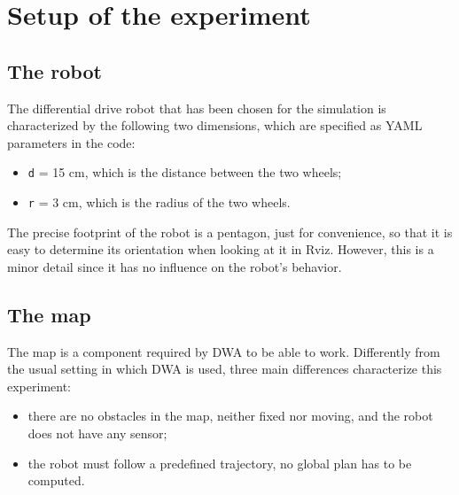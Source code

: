 \documentclass[11pt,a4paper]{article}
\begin{document}

\section{Setup of the experiment}



\subsection{The robot}

The differential drive robot that has been chosen for the simulation is characterized by the following
two dimensions, which are specified as YAML parameters in the code:
\begin{itemize}
    \item \texttt{d} = 15 cm, which is the distance between the two wheels;
    \item \texttt{r} = 3 cm, which is the radius of the two wheels.\\
\end{itemize}

The precise footprint of the robot is a pentagon, just for convenience, so that it is easy to determine its
orientation when looking at it in Rviz.
However, this is a minor detail since it has no influence on the robot's behavior.



\subsection{The map}

The map is a component required by DWA to be able to work. Differently from the usual setting in which
DWA is used, three main differences characterize this experiment:
\begin{itemize}
    \item there are no obstacles in the map, neither fixed nor moving, and the robot does not have any sensor;
    \item the robot must follow a predefined trajectory, no global plan has to be computed.\\
\end{itemize}
\end{document}
